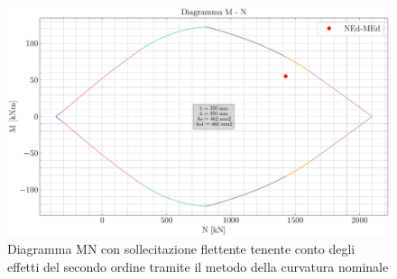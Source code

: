 \begin{figure}[htb]
    \centering
    \includegraphics[width=\textwidth]{IMG/M_N_diagram_pilastro_secondo_ordine.pdf}
    \caption{Diagramma MN con sollecitazione flettente tenente conto degli effetti del secondo ordine tramite il metodo della curvatura nominale}
    \label{fig:MN_diagram_secondo_ordine}
\end{figure}